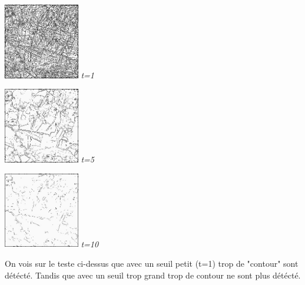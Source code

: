 \documentclass[a4,12pt]{article}
\begin{document}
\noindent
\begin{center}
\begin{minipage}[c]{0.20\linewidth}
	\begin{center}
		\includegraphics[width = 33mm]{./img/p2test_grad_fin_aqitain_t1.jpg}
		\textit{t=1}
	\end{center}
\end{minipage}
\begin{minipage}[c]{0.20\linewidth}
	\begin{center}
		\includegraphics[width = 33mm]{./img/p2test_grad_fin_aqitain_t5.jpg}
		\textit{t=5}
	\end{center}
\end{minipage}
\begin{minipage}[c]{0.20\linewidth}
	\begin{center}
		\includegraphics[width = 33mm]{./img/p2test_grad_fin_aqitain_t10.jpg}
		\textit{t=10}
	\end{center}
\end{minipage}
\end{center}

On vois sur le teste ci-dessus que avec un seuil petit (t=1) trop de "contour" sont détécté.
Tandis que avec un seuil trop grand trop de contour ne sont plus détécté.\\
\end{document}
